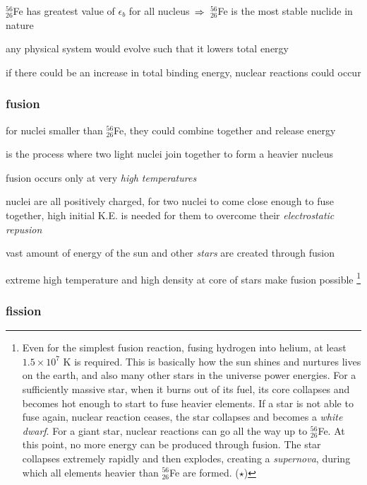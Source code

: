 \cmt $^{56}_{26}$Fe has greatest value of $\epsilon_b$ for all nucleus $\, \Rightarrow \,$ $^{56}_{26}$Fe is the most stable nuclide in nature

\cmt any physical system would evolve such that it lowers total energy

if there could be an increase in total binding energy, nuclear reactions could occur


\subsubsection{fusion}

for nuclei smaller than $^{56}_{26}$Fe, they could combine together and release energy

\begin{ilight}
	 is the process where two light nuclei join together to form a heavier nucleus
\end{ilight}

\cmt fusion occurs only at very \emph{high temperatures}

nuclei are all positively charged, for two nuclei to come close enough to fuse together, high initial K.E. is needed for them to overcome their \emph{electrostatic repusion}

\cmt vast amount of energy of the sun and other \emph{stars} are created through fusion

extreme high temperature and high density at core of stars make fusion possible
\footnote{Even for the simplest fusion reaction, fusing hydrogen into helium, at least $1.5\times 10^7 \text{ K}$ is required. This is basically how the sun shines and nurtures lives on the earth, and also many other stars in the universe power energies. For a sufficiently massive star, when it burns out of its fuel, its core collapses and becomes hot enough to start to fuse heavier elements. If a star is not able to fuse again, nuclear reaction ceases, the star collapses and becomes a \emph{white dwarf}. For a giant star, nuclear reactions can go all the way up to $^{56}_{26}$Fe. At this point, no more energy can be produced through fusion. The star collapses extremely rapidly and then explodes, creating a \emph{supernova}, during which all elements heavier than $^{56}_{26}$Fe are formed. ($\star$)}


\subsubsection{fission}

